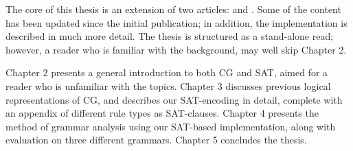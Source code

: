 The core of this thesis is an extension of two articles: \cite{listenmaa_claessen2015} and \cite{listenmaa_claessen2016}. Some of the content has been updated since the initial publication; in addition, the implementation is described in much more detail. The thesis is structured as a stand-alone read; however, a reader who is familiar with the background, may well skip Chapter 2.

Chapter 2 presents a general introduction to both CG and SAT, aimed for a reader who is unfamiliar with the topics.
Chapter 3 discusses previous logical representations of CG, and describes our SAT-encoding in detail, complete with an appendix of different rule types as SAT-clauses.
Chapter 4 presents the method of grammar analysis using our SAT-based implementation, along with evaluation on three different grammars.
Chapter 5 concludes the thesis.
